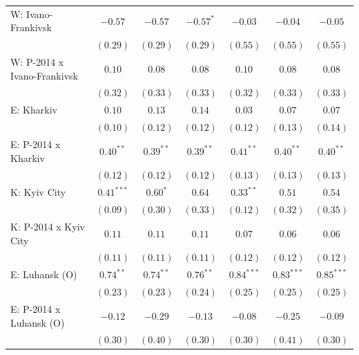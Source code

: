\begin{table}
\begin{center}
\begin{small}
\begin{tabular}{l c c c c c c}
W: Ivano-Frankivsk          & $-0.57$       & $-0.57$       & $-0.57^{*}$   & $-0.03$      & $-0.04$      & $-0.05$      \\
                            & $(0.29)$      & $(0.29)$      & $(0.29)$      & $(0.55)$     & $(0.55)$     & $(0.55)$     \\
W: P-2014 x Ivano-Frankivsk & $0.10$        & $0.08$        & $0.08$        & $0.10$       & $0.08$       & $0.08$       \\
                            & $(0.32)$      & $(0.33)$      & $(0.33)$      & $(0.32)$     & $(0.33)$     & $(0.33)$     \\
E: Kharkiv                  & $0.10$        & $0.13$        & $0.14$        & $0.03$       & $0.07$       & $0.07$       \\
                            & $(0.10)$      & $(0.12)$      & $(0.12)$      & $(0.12)$     & $(0.13)$     & $(0.14)$     \\
E: P-2014 x Kharkiv         & $0.40^{**}$   & $0.39^{**}$   & $0.39^{**}$   & $0.41^{**}$  & $0.40^{**}$  & $0.40^{**}$  \\
                            & $(0.12)$      & $(0.12)$      & $(0.12)$      & $(0.13)$     & $(0.13)$     & $(0.13)$     \\
K: Kyiv City                & $0.41^{***}$  & $0.60^{*}$    & $0.64$        & $0.33^{**}$  & $0.51$       & $0.54$       \\
                            & $(0.09)$      & $(0.30)$      & $(0.33)$      & $(0.12)$     & $(0.32)$     & $(0.35)$     \\
K: P-2014 x Kyiv City       & $0.11$        & $0.11$        & $0.11$        & $0.07$       & $0.06$       & $0.06$       \\
                            & $(0.11)$      & $(0.11)$      & $(0.11)$      & $(0.12)$     & $(0.12)$     & $(0.12)$     \\
E: Luhansk (O)              & $0.74^{**}$   & $0.74^{**}$   & $0.76^{**}$   & $0.84^{***}$ & $0.83^{***}$ & $0.85^{***}$ \\
                            & $(0.23)$      & $(0.23)$      & $(0.24)$      & $(0.25)$     & $(0.25)$     & $(0.25)$     \\
E: P-2014 x Luhansk (O)     & $-0.12$       & $-0.29$       & $-0.13$       & $-0.08$      & $-0.25$      & $-0.09$      \\
                            & $(0.30)$      & $(0.40)$      & $(0.30)$      & $(0.30)$     & $(0.41)$     & $(0.30)$     \\

\end{tabular}
\end{small}
\end{center}
\end{table}
